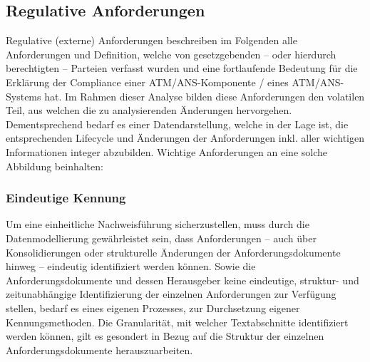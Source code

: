 \subsection{Regulative Anforderungen}\label{model_anforderungen}

Regulative (externe) Anforderungen beschreiben im Folgenden alle Anforderungen und Definition, welche von gesetzgebenden -- oder hierdurch berechtigten -- Parteien verfasst wurden und eine fortlaufende Bedeutung für die Erklärung der Compliance einer ATM/ANS-Komponente / eines ATM/ANS-Systems hat.   
Im Rahmen dieser Analyse bilden diese Anforderungen den volatilen Teil, aus welchen die zu analysierenden Änderungen hervorgehen.
Dementsprechend bedarf es einer Datendarstellung, welche in der Lage ist, die entsprechenden Lifecycle und Änderungen der Anforderungen inkl. aller wichtigen Informationen integer abzubilden.   
Wichtige Anforderungen an eine solche Abbildung beinhalten:

\subsubsection{Eindeutige Kennung}

    Um eine einheitliche Nachweisführung sicherzustellen, muss durch die Datenmodellierung gewährleistet sein, dass Anforderungen -- auch über Konsolidierungen oder strukturelle Änderungen der Anforderungsdokumente hinweg -- eindeutig identifiziert werden können.
    Sowie die Anforderungsdokumente und dessen Herausgeber keine eindeutige, struktur- und zeitunabhängige Identifizierung der  einzelnen Anforderungen zur Verfügung stellen, bedarf es eines eigenen Prozesses, zur Durchsetzung eigener Kennungsmethoden.  
Die Granularität, mit welcher Textabschnitte identifiziert werden können, gilt es gesondert in Bezug auf die Struktur der einzelnen Anforderungsdokumente herauszuarbeiten.

